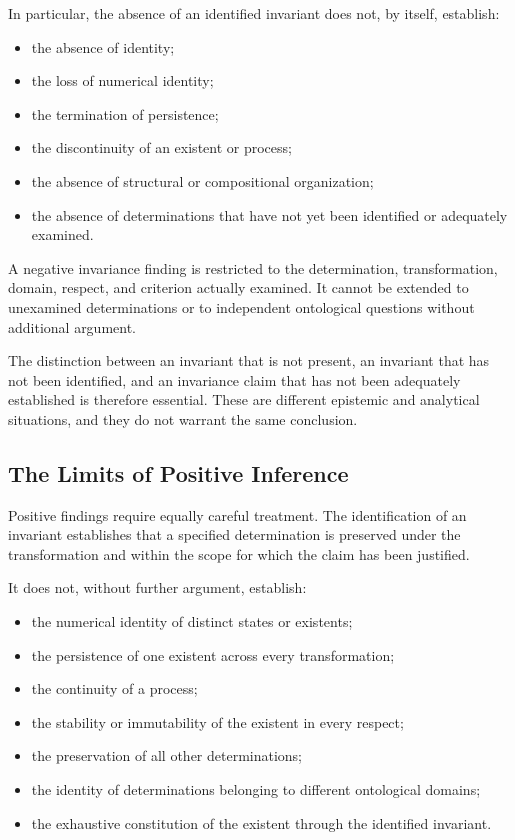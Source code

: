In particular, the absence of an identified invariant
does not, by itself, establish:

\begin{itemize}
    \item the absence of identity;
    \item the loss of numerical identity;
    \item the termination of persistence;
    \item the discontinuity of an existent or process;
    \item the absence of structural or compositional
          organization;
    \item the absence of determinations that have not
          yet been identified or adequately examined.
\end{itemize}

A negative invariance finding is restricted to the
determination, transformation, domain, respect, and
criterion actually examined. It cannot be extended
to unexamined determinations or to independent
ontological questions without additional argument.

The distinction between an invariant that is not
present, an invariant that has not been identified,
and an invariance claim that has not been adequately
established is therefore essential. These are different
epistemic and analytical situations, and they do not
warrant the same conclusion.

\subsection{The Limits of Positive Inference}

Positive findings require equally careful treatment.
The identification of an invariant establishes that
a specified determination is preserved under the
transformation and within the scope for which the
claim has been justified.

It does not, without further argument, establish:

\begin{itemize}
    \item the numerical identity of distinct states
          or existents;
    \item the persistence of one existent across every
          transformation;
    \item the continuity of a process;
    \item the stability or immutability of the existent
          in every respect;
    \item the preservation of all other determinations;
    \item the identity of determinations belonging
          to different ontological domains;
    \item the exhaustive constitution of the existent
          through the identified invariant.
\end{itemize}

